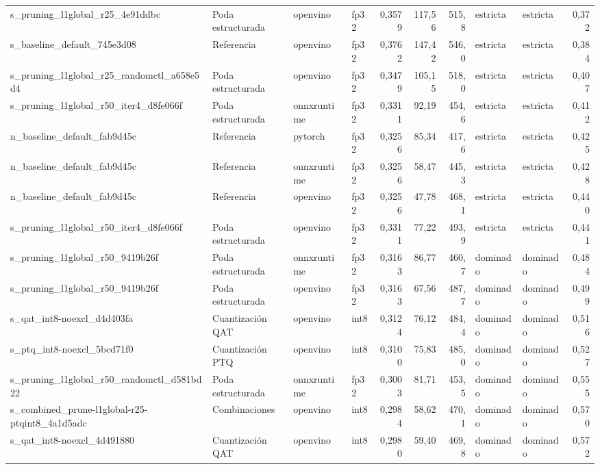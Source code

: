 \begin{landscape}
\begin{table}[htbp]
\begin{adjustbox}{max width=\linewidth, max totalheight=\dimexpr\textheight-\ht\tfmedgetitle-\dp\tfmedgetitle-\ht\tfmedgenotes-\dp\tfmedgenotes-6pt\relax}
\begin{tabular}{llllrrrllr}
    s\_pruning\_l1global\_r25\_4e91ddbc & Poda estructurada & openvino & fp32 & 0,3579 & 117,56 & 515,8 & estricta & estricta & 0,372 \\
    s\_baseline\_default\_745e3d08 & Referencia & openvino & fp32 & 0,3762 & 147,42 & 546,0 & estricta & estricta & 0,384 \\
    s\_pruning\_l1global\_r25\_randomctl\_a658e5d4 & Poda estructurada & openvino & fp32 & 0,3479 & 105,15 & 518,0 & estricta & estricta & 0,407 \\
    s\_pruning\_l1global\_r50\_iter4\_d8fe066f & Poda estructurada & onnxruntime & fp32 & 0,3311 & 92,19 & 454,6 & estricta & estricta & 0,412 \\
    n\_baseline\_default\_fab9d45c & Referencia & pytorch & fp32 & 0,3256 & 85,34 & 417,6 & estricta & estricta & 0,425 \\
    n\_baseline\_default\_fab9d45c & Referencia & onnxruntime & fp32 & 0,3256 & 58,47 & 445,3 & estricta & estricta & 0,428 \\
    n\_baseline\_default\_fab9d45c & Referencia & openvino & fp32 & 0,3256 & 47,78 & 468,1 & estricta & estricta & 0,440 \\
    s\_pruning\_l1global\_r50\_iter4\_d8fe066f & Poda estructurada & openvino & fp32 & 0,3311 & 77,22 & 493,9 & estricta & estricta & 0,441 \\
    s\_pruning\_l1global\_r50\_9419b26f & Poda estructurada & onnxruntime & fp32 & 0,3163 & 86,77 & 460,7 & dominado & dominado & 0,484 \\
    s\_pruning\_l1global\_r50\_9419b26f & Poda estructurada & openvino & fp32 & 0,3163 & 67,56 & 487,7 & dominado & dominado & 0,499 \\
    s\_qat\_int8-noexcl\_d4d403fa & Cuantización QAT & openvino & int8 & 0,3124 & 76,12 & 484,4 & dominado & dominado & 0,516 \\
    s\_ptq\_int8-noexcl\_5bcd71f0 & Cuantización PTQ & openvino & int8 & 0,3100 & 75,83 & 485,0 & dominado & dominado & 0,527 \\
    s\_pruning\_l1global\_r50\_randomctl\_d581bd22 & Poda estructurada & onnxruntime & fp32 & 0,3003 & 81,71 & 453,5 & dominado & dominado & 0,555 \\
    s\_combined\_prune-l1global-r25-ptqint8\_4a1d5adc & Combinaciones & openvino & int8 & 0,2984 & 58,62 & 470,1 & dominado & dominado & 0,570 \\
    s\_qat\_int8-noexcl\_4d491880 & Cuantización QAT & openvino & int8 & 0,2980 & 59,40 & 469,8 & dominado & dominado & 0,572 \\

\end{tabular}
\end{adjustbox}
\end{table}
\end{landscape}
